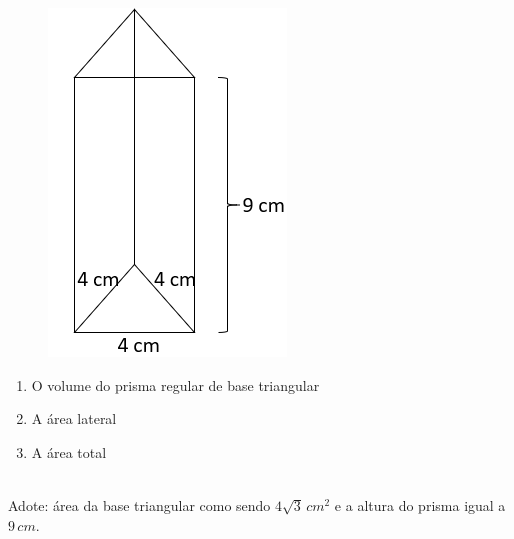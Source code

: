 \documentclass[a4paper, 12pt]{article}
\begin{document}
\begin{enumerate}
		\begin{minipage}{.5\linewidth}		
			\begin{figure}[H]
			\centering
			\includegraphics[scale= 0.5]{prisma}
			\end{figure}
		\end{minipage}
		\begin{minipage}{.5\linewidth}		
			\begin{enumerate}
				\item O volume do prisma regular de base triangular
				\item A área lateral
				\item A área total
			\end{enumerate}	
		\end{minipage}\\

		
Adote: área da base triangular como sendo $4\sqrt{3} \, cm^2$ e a altura do prisma igual a $9 \, cm$.
\vspace{0.7cm}
	
	
	
	\end{enumerate}	

\end{document}
